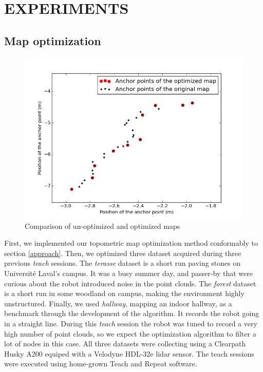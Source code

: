 \documentclass[letterpaper,10 pt,conference]{ieeeconf}
\begin{document}
\section{EXPERIMENTS}

\subsection{Map optimization}

\begin{figure}
  \centering
  \includegraphics[scale=0.4]{map_optimization}
  \caption{Comparison of un-optimized and optimized maps}
\end{figure}

First, we implemented our topometric map optimization method conformably to section \ref{approach}.
Then, we optimized three dataset acquired during three previous \textit{teach} sessions. The
\textit{terasse} dataset is a short run paving stones on Université Laval's campus. It was a busy
summer day, and passer-by that were curious about the robot introduced noise in the point
clouds. The \textit{forest} dataset is a short run in some woodland on campus, making the environment
highly unstructured. Finally, we used \textit{hallway}, mapping an indoor hallway, as a
benchmark through the development of the algorithm. It records the robot going in a straight line.
During this \textit{teach} session the robot was tuned to record a very high number of point clouds,
so we expect the optimization algorithm to filter a lot of nodes in this case. All three datasets
were collecting using a Clearpath Husky A200 equiped with a Velodyne HDL-32e lidar sensor. The teach
sessions were executed using home-grown Teach and Repeat software.
\end{document}
